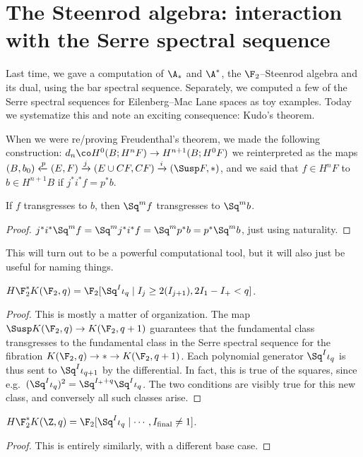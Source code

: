 \section{The Steenrod algebra: interaction with the Serre spectral sequence}

Last time, we gave a computation of $\A_*$ and $\A^*$, the $\F_2$--Steenrod algebra and its dual, using the bar spectral sequence.  Separately, we computed a few of the Serre spectral sequences for Eilenberg--Mac Lane spaces as toy examples.  Today we systematize this and note an exciting consequence: Kudo's theorem.

When we were re/proving Freudenthal's theorem, we made the following construction: $d_n\co H^0(B; H^n F) \to H^{n+1}(B; H^0 F)$ we reinterpreted as the maps $(B, b_0) \xleftarrow p (E, F) \xrightarrow j (E \cup CF, CF) \xrightarrow i (\Susp F, *)$, and we said that $f \in H^n F$  to $b \in H^{n+1} B$ if $j^* i^* f = p^* b$.

\begin{lemma}
If $f$ transgresses to $b$, then $\Sq^m f$ transgresses to $\Sq^m b$.
\end{lemma}
\begin{proof}
$j^* i^* \Sq^m f = \Sq^m j^* i^* f = \Sq^m p^* b = p^* \Sq^m b$, just using naturality.
\end{proof}

This will turn out to be a powerful computational tool, but it will also just be useful for naming things.

\begin{theorem}
$H\F_2^* K(\F_2, q) = \F_2[\Sq^I \iota_q \mid I_j \ge 2(I_{j+1}), 2I_1 - I_+ < q]$.
\end{theorem}
\begin{proof}
This is mostly a matter of organization.  The map $\Susp K(\F_2, q) \to K(\F_2, q+1)$ guarantees that the fundamental class transgresses to the fundamental class in the Serre spectral sequence for the fibration $K(\F_2, q) \to * \to K(\F_2, q+1)$.  Each polynomial generator $\Sq^I \iota_q$ is thus sent to $\Sq^I \iota_{q+1}$ by the differential.  In fact, this is true of the squares, since e.g.\ $(\Sq^I \iota_q)^2 = \Sq^{I_+ + q} \Sq^I \iota_q$.  The two conditions are visibly true for this new class, and conversely all such classes arise.
\end{proof}

\begin{theorem}
$H\F_2^* K(\Z, q) = \F_2[\Sq^I \iota_q \mid \cdots, I_{\text{final}} \ne 1]$.
\end{theorem}
\begin{proof}
This is entirely similarly, with a different base case.
\end{proof}


